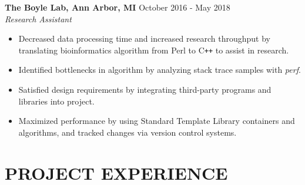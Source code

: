 \documentclass[overlapped]{res}
\begin{document}
\begin{resume}
                \textbf{The Boyle Lab, Ann Arbor, MI}
                \hfill October 2016 - May 2018 \\
                {\sl Research Assistant}
                 \begin{itemize}  \itemsep -2pt %
                 \item Decreased data processing time and increased research throughput
                  by translating bioinformatics algorithm 
                 from Perl to C\texttt{++}
                 to assist in research.
                 
                 \item Identified bottlenecks in algorithm by analyzing stack trace samples with \textit{perf}.
                 
                 \item Satisfied design requirements by integrating third-party programs 
                 and libraries into project.
                 
                 \item Maximized performance by using 
                 Standard Template Library containers and algorithms,
                 and tracked changes via version control systems.
                \end{itemize}


 \section{PROJECT EXPERIENCE}
      

\end{resume}
\end{document}
